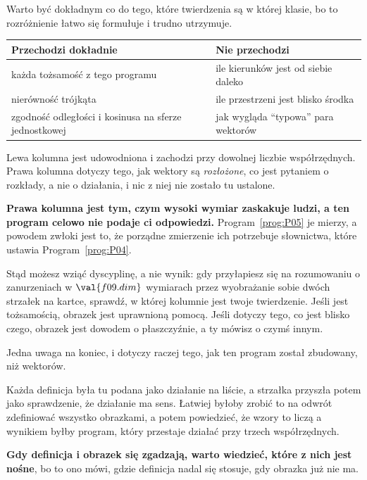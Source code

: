 \begin{fr}
Warto być dokładnym co do tego, które twierdzenia są w której klasie, bo to
rozróżnienie łatwo się formułuje i trudno utrzymuje.

\begin{center}
\begin{tabularx}{\linewidth}{@{}lX@{}}
\toprule
Przechodzi dokładnie & Nie przechodzi \\
\midrule
każda tożsamość z tego programu & ile kierunków jest od siebie daleko \\
nierówność trójkąta & ile przestrzeni jest blisko środka \\
zgodność odległości i kosinusa na sferze jednostkowej & jak wygląda
  \enquote{typowa} para wektorów \\
\bottomrule
\end{tabularx}
\end{center}

Lewa kolumna jest udowodniona i zachodzi przy dowolnej liczbie współrzędnych.
Prawa kolumna dotyczy tego, jak wektory są \emph{rozłożone}, co jest pytaniem
o rozkłady, a nie o działania, i nic z niej nie zostało tu ustalone.

\begin{warning}
\textbf{Prawa kolumna jest tym, czym wysoki wymiar zaskakuje ludzi, a ten
program celowo nie podaje ci odpowiedzi.} Program~\ref{prog:P05} je mierzy, a
powodem zwłoki jest to, że porządne zmierzenie ich potrzebuje słownictwa, które
ustawia Program~\ref{prog:P04}.

Stąd możesz wziąć dyscyplinę, a nie wynik: gdy przyłapiesz się na
rozumowaniu o zanurzeniach w $\val{f09.dim}$ wymiarach przez wyobrażanie sobie
dwóch strzałek na kartce, sprawdź, w której kolumnie jest twoje twierdzenie.
Jeśli jest tożsamością, obrazek jest uprawnioną pomocą. Jeśli dotyczy tego, co
jest blisko czego, obrazek jest dowodem o płaszczyźnie, a ty mówisz o czymś
innym.
\end{warning}
\end{fr}

\begin{fr}
Jedna uwaga na koniec, i dotyczy raczej tego, jak ten program został zbudowany,
niż wektorów.

Każda definicja była tu podana jako działanie na liście, a strzałka przyszła
potem jako sprawdzenie, że działanie ma sens. Łatwiej byłoby zrobić to na
odwrót \dash{} zdefiniować wszystko obrazkami, a potem powiedzieć, że wzory to
liczą \dash{} a wynikiem byłby program, który przestaje działać przy trzech
współrzędnych.

\textbf{Gdy definicja i obrazek się zgadzają, warto wiedzieć, które z nich jest
nośne}, bo to ono mówi, gdzie definicja nadal się stosuje, gdy obrazka już nie
ma.
\end{fr}

